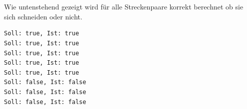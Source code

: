 \documentclass[12pt]{scrartcl}
\begin{document}
\ \\~\\
Wie untenstehend gezeigt wird für alle Streckenpaare korrekt berechnet ob sie sich schneiden oder nicht.\\

\begin{lstlisting}[style=Terminal, caption={testing.cpp: Ausgabe Konsole},captionpos=b]
Soll: true, Ist: true
Soll: true, Ist: true
Soll: true, Ist: true
Soll: true, Ist: true
Soll: true, Ist: true
Soll: false, Ist: false
Soll: false, Ist: false
Soll: false, Ist: false    
\end{lstlisting}
\end{document}
